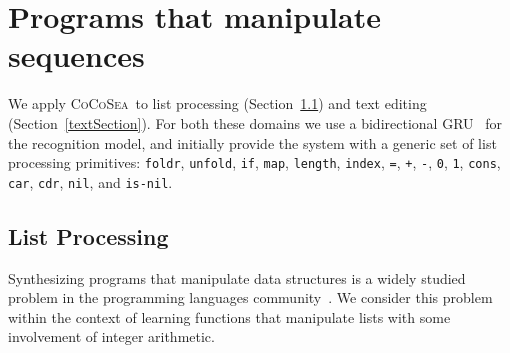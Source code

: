 \documentclass{article}
\newcommand{\system}{\textsc{CoCoSea}~}
\newcommand{\code}[1]{{\footnotesize\texttt{#1}}}
\begin{document}


\section{Programs that manipulate sequences}\label{sequences}
We apply \system to list processing (Section~\ref{listSection}) and text editing (Section~\ref{textSection}).
For both these domains we use a bidirectional GRU~\cite{cho2014learning} for
the recognition model, and initially provide the system with a generic set
of list processing primitives:
\code{foldr}, \code{unfold}, \code{if}, \code{map}, \code{length},
\code{index}, \code{=}, \code{+}, \code{-}, \code{0}, \code{1}, \code{cons},
\code{car}, \code{cdr}, \code{nil}, and \code{is-nil}.



\subsection{List Processing}\label{listSection}
Synthesizing programs that manipulate data structures is a widely studied
problem in the programming languages community~\cite{feser2015synthesizing}.
We consider this problem within the context of learning functions that
manipulate lists with some involvement of integer arithmetic.
\end{document}
